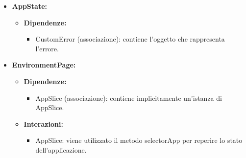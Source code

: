 \begin{itemize}
      \item \textbf{AppState:}
            \begin{itemize}
                  \item \textbf{Dipendenze:}
                        \begin{itemize}
                              \item CustomError (associazione): contiene l'oggetto che rappresenta l'errore.
                        \end{itemize}
            \end{itemize}

      \item \textbf{EnvironmentPage:}
            \begin{itemize}
                  \item \textbf{Dipendenze:}
                        \begin{itemize}
                              \item AppSlice (associazione): contiene implicitamente un'istanza di AppSlice.
                        \end{itemize}
                  \item \textbf{Interazioni:}
                        \begin{itemize}
                              \item AppSlice: viene utilizzato il metodo selectorApp per reperire lo stato
                                    dell'applicazione.
                        \end{itemize}
            \end{itemize}
\end{itemize}

